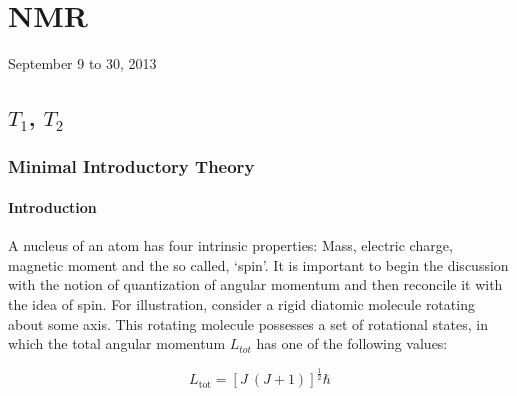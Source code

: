 \chapter{NMR}

\def\*#1{\boldsymbol{#1}}
\let\oldhat\hat
\renewcommand{\hat}[1]{\oldhat{\*{#1}}}

\def\dc{\,\,\xleftrightarrow[\text{DC}]{}\,\,}
\def\bra#1{\langle#1|}
\def\ket#1{|#1 \rangle}
\def\inpr#1#2{\langle #1|#2 \rangle}
\def\oupr#1#2{| #1 \rangle \langle #2 |}
\def\braket#1#2#3{\langle#1|#2|#3\rangle}
\def\ha#1{#1^\dagger}
\def\expval#1{\langle #1 \rangle}


\begin{flushright}
September 9 to 30, 2013 \\
\end{flushright}


\section{$T_1$, $T_2$}
	\subsection{Minimal Introductory Theory}
		\subsubsection{Introduction}

		A nucleus of an atom has four intrinsic properties: Mass, electric
		charge, magnetic moment and the so called, `spin'. It is important
		to begin the discussion with the notion of quantization of angular
		momentum and then reconcile it with the idea of spin. For illustration,
		consider a rigid diatomic molecule rotating about some axis. This
		rotating molecule possesses a set of rotational states, in which the
		total angular momentum $L_{tot}$ has one of the following values:

		\begin{equation}
		L_\text{tot}=[J\ (J+1)]^{\frac{1}{2}}\hbar
		\end{equation}


